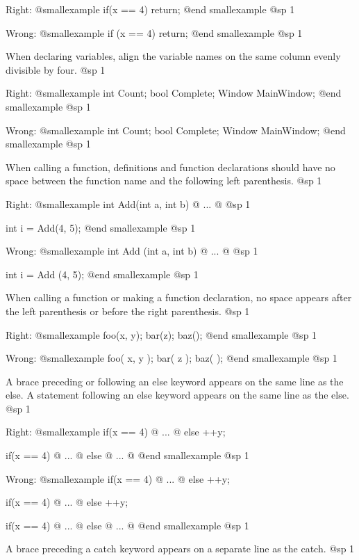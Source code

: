 Right:
@smallexample
if(x == 4)
    return;
@end smallexample
@sp 1

Wrong:
@smallexample
if (x == 4)
    return;
@end smallexample
@sp 1

\item
When declaring variables, align the variable names on the same column evenly divisible by four.
@sp 1

Right:
@smallexample
int     Count;
bool    Complete;
Window  MainWindow;
@end smallexample
@sp 1

Wrong:
@smallexample
int Count;
bool Complete;
Window MainWindow;
@end smallexample
@sp 1

\item
When calling a function, definitions and function declarations should have no space between the function name and the following left parenthesis.
@sp 1

Right:
@smallexample
int Add(int a, int b)
@{ 
    ... 
@}
@sp 1

int i = Add(4, 5);
@end smallexample
@sp 1

Wrong:
@smallexample
int Add (int a, int b)
@{
    ...
@}
@sp 1

int i = Add (4, 5);
@end smallexample
@sp 1

\item
When calling a function or making a function declaration, no space appears after the left parenthesis or before the right parenthesis.
@sp 1

Right:
@smallexample
foo(x, y);
bar(z);
baz();
@end smallexample
@sp 1

Wrong:
@smallexample
foo( x, y );
bar( z );
baz( );
@end smallexample
@sp 1

\item
A brace preceding or following an else keyword appears on the same line as the else. A statement following an else keyword appears on the same line as the else. 
@sp 1

Right:
@smallexample
if(x == 4)
@{
    ...
@}
else
  ++y;

if(x == 4)
@{
    ...
@}
else
@{
    ...
@}
@end smallexample
@sp 1

Wrong:
@smallexample
if(x == 4) @{
    ...
@}
else ++y;

if(x == 4) @{
    ...
@} else ++y;

if(x == 4) @{
    ...
@}
else @{
    ...
@}
@end smallexample
@sp 1

\item
A brace preceding a catch keyword appears on a separate line as the catch. 
@sp 1

